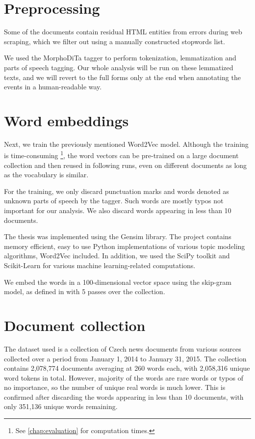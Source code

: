 \section{Preprocessing}
Some of the documents contain residual HTML entities from errors during web scraping, which we filter out using a manually constructed stopwords list.

We used the MorphoDiTa tagger \cite{morphodita} to perform tokenization, lemmatization and parts of speech tagging. Our whole analysis will be run on these lemmatized texts, and we will revert to the full forms only at the end when annotating the events in a human-readable way.


\section{Word embeddings} \label{word-embeddings}
Next, we train the previously mentioned Word2Vec model. Although the training is time-consuming \footnote{See \autoref{chap:evaluation} for computation times.}, the word vectors can be pre-trained on a large document collection and then reused in following runs, even on different documents as long as the vocabulary is similar.

For the training, we only discard punctuation marks and words denoted as unknown parts of speech by the tagger. Such words are mostly typos not important for our analysis. We also discard words appearing in less than 10 documents.

The thesis was implemented using the Gensim \cite{gensim} library. The project contains memory efficient, easy to use Python implementations of various topic modeling algorithms, Word2Vec included. In addition, we used the SciPy toolkit \cite{scipy} and Scikit-Learn \cite{scikit-learn} for various machine learning-related computations.

We embed the words in a 100-dimensional vector space using the skip-gram model, as defined in \cite{word2vec} with 5 passes over the collection.


\section{Document collection}
The dataset used is a collection of Czech news documents from various sources collected over a period from January 1, 2014 to January 31, 2015. The collection contains 2,078,774 documents averaging at 260 words each, with 2,058,316 unique word tokens in total. However, majority of the words are rare words or typos of no importance, so the number of unique real words is much lower. This is confirmed after discarding the words appearing in less than 10 documents, with only 351,136 unique words remaining.


